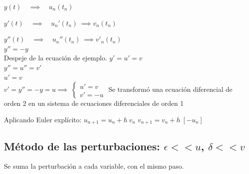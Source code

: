     $y(t)\quad \implies \quad u_n(t_n)$

    $y'(t)\quad \implies \quad u_n'(t_n)\ \implies v_n(t_n)$

    $y''(t)\quad \implies \quad u_n''(t_n)\ \implies v'_n(t_n)$\\
$y'' = -y$\\ Despeje de la ecuación de ejemplo.
$y' = u' = v$\\
$y'' = u'' = v'$\\
$u'=v$\\
$v'=y''=-y=u\implies\ \begin{cases} u'=v\\ v' = -u\end{cases}$
Se transformó una ecuación diferencial de orden 2 en un sistema de
ecuaciones diferenciales de orden 1

Aplicando Euler explícito:
$u_{n+1}=u_n+h\ v_n$
$v_{n+1}=v_n+h\ [-u_n]$

\subsection{Método de las perturbaciones: $\epsilon << u$, $\delta << v$}
Se suma la perturbación a cada variable, con el mismo paso.